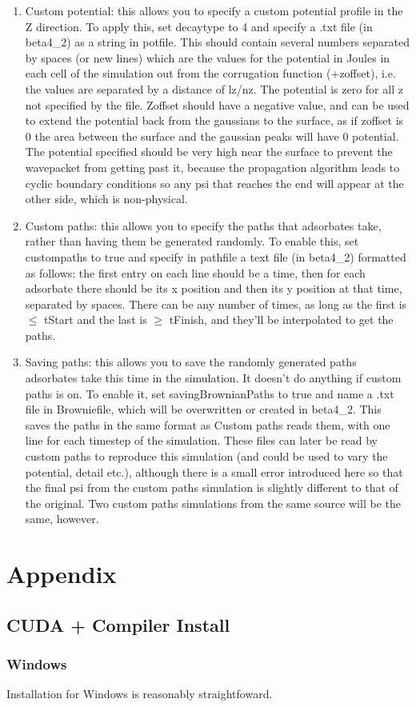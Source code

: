 \documentclass[11pt,letterpaper]{article}
\begin{document}
\begin{enumerate}
    \item Custom potential: this allows you to specify a custom potential profile in the Z direction. To apply this, set decaytype to 4 and specify a .txt file (in beta4\_2) as a string in potfile. This should contain several numbers separated by spaces (or new lines) which are the values for the potential in Joules in each cell of the simulation out from the corrugation function (+zoffset), i.e. the values are separated by a distance of lz/nz. The potential is zero for all z not specified by the file. Zoffset should have a negative value, and can be used to extend the potential back from the gaussians to the surface, as if zoffset is 0 the area between the surface and the gaussian peaks will have 0 potential. The potential specified should be very high near the surface to prevent the wavepacket from getting past it, because the propagation algorithm leads to cyclic boundary conditions so any psi that reaches the end will appear at the other side, which is non-physical.
    \item Custom paths: this allows you to specify the paths that adsorbates take, rather than having them be generated randomly. To enable this, set custompaths to true and specify in pathfile a text file (in beta4\_2) formatted as follows: the first entry on each line should be a time, then for each adsorbate there should be its x position and then its y position at that time, separated by spaces. There can be any number of times, as long as the first is $\leq$ tStart and the last is $\geq$ tFinish, and they’ll be interpolated to get the paths. 
    \item Saving paths: this allows you to save the randomly generated paths adsorbates take this time in the simulation. It doesn’t do anything if custom paths is on. To enable it, set savingBrownianPaths to true and name a .txt file in Browniefile, which will be overwritten or created in beta4\_2. This saves the paths in the same format as Custom paths reads them, with one line for each timestep of the simulation. These files can later be read by custom paths to reproduce this simulation (and could be used to vary the potential, detail etc.), although there is a small error introduced here so that the final psi from the custom paths simulation is slightly different to that of the original. Two custom paths simulations from the same source will be the same, however.
\end{enumerate}



\section{Appendix}

\subsection{CUDA + Compiler Install}

\label{sec:compilerinstall}
\subsubsection{Windows}
Installation for Windows is reasonably straightfoward.
\end{document}
